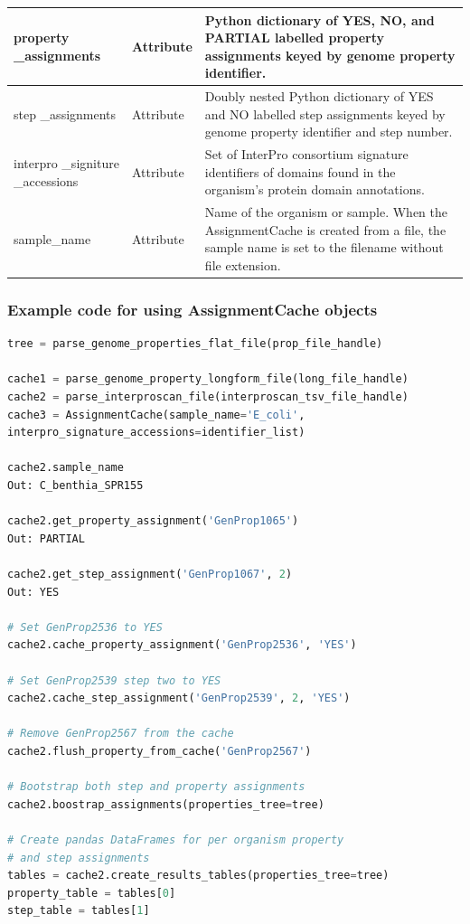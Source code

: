 \begin{longtable}{|p{2.7cm}|p{2cm}|p{10cm}|}
property \_assignments & Attribute & Python dictionary of YES, NO, and PARTIAL 
labelled property assignments keyed by genome property identifier. \\ \hline
step \_assignments & Attribute & Doubly nested Python dictionary of YES and NO 
labelled step assignments keyed by genome property identifier and step number. 
\\ \hline
interpro \_signiture \_accessions & Attribute & Set of InterPro consortium 
signature identifiers of domains found in the organism's protein domain 
annotations. \\ \hline
sample\_name & Attribute & Name of the organism or sample. When the 
AssignmentCache is created from a file, the sample name is set to the filename 
without file extension. \\ \hline
\end{longtable}

\FloatBarrier
\subsubsection{Example code for using AssignmentCache  objects}

\begin{lstlisting}[language=Python]
tree = parse_genome_properties_flat_file(prop_file_handle)

cache1 = parse_genome_property_longform_file(long_file_handle)
cache2 = parse_interproscan_file(interproscan_tsv_file_handle)
cache3 = AssignmentCache(sample_name='E_coli', 
interpro_signature_accessions=identifier_list)

cache2.sample_name
Out: C_benthia_SPR155

cache2.get_property_assignment('GenProp1065')
Out: PARTIAL

cache2.get_step_assignment('GenProp1067', 2) 
Out: YES

# Set GenProp2536 to YES
cache2.cache_property_assignment('GenProp2536', 'YES')

# Set GenProp2539 step two to YES
cache2.cache_step_assignment('GenProp2539', 2, 'YES')

# Remove GenProp2567 from the cache
cache2.flush_property_from_cache('GenProp2567')

# Bootstrap both step and property assignments
cache2.boostrap_assignments(properties_tree=tree)

# Create pandas DataFrames for per organism property
# and step assignments
tables = cache2.create_results_tables(properties_tree=tree)
property_table = tables[0]
step_table = tables[1]

\end{lstlisting}

